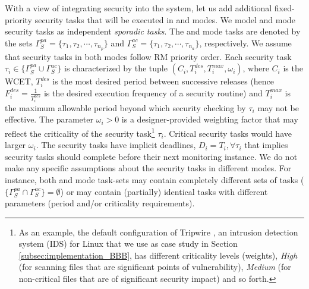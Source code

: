\documentclass[../rt_server_main.tex]{subfiles}
\begin{document}
With a view of integrating  security into the system, let us add additional fixed-priority security tasks that will be executed in \pve and \ave modes. We model \pve and \ave mode security tasks as independent \textit{sporadic tasks}. The \pve and \ave mode tasks are denoted by the sets $\Gamma_S^{pa} = \lbrace \tau_1, \tau_2, \cdots , \tau_{n_p} \rbrace$ and $\Gamma_S^{ac} = \lbrace \tau_1, \tau_2, \cdots , \tau_{n_a} \rbrace$, respectively.
We assume that security tasks in both modes follow RM priority order. Each security task $\tau_i \in \lbrace \Gamma_S^{pa} \cup \Gamma_S^{ac} \rbrace$ is characterized by the tuple $(C_i, T_i^{des}, T_i^{max}, \omega_i)$, where $C_i$ is the WCET, $T_i^{des}$ is the most desired period between successive releases (hence $F_i^{des} = \frac{1}{T_i^{des}}$ is the desired execution frequency of a security routine) and $T_i^{max}$ is the maximum allowable period beyond which security checking by $\tau_i$ may not be effective. The parameter $\omega_i > 0$ is a designer-provided weighting factor that may reflect the criticality of the security task\footnote{As an example, the default configuration of Tripwire \cite{tripwire}, an intrusion detection system (IDS) for Linux that we use as case study in Section \ref{subsec:implementation_BBB}, has different criticality levels (\viz weights), \ie  \textit{High} (for scanning files that are significant points of vulnerability), \textit{Medium} (for non-critical files that are of significant security impact) and so forth.} $\tau_i$. %
Critical security tasks would have larger $\omega_i$. The security tasks have implicit deadlines, \eg $D_i = T_i, \forall \tau_i$ that implies security tasks should complete before %
their next monitoring instance. 
We do not make any specific assumptions about the security tasks in different modes. For instance, both \pve and \ave mode task-sets may contain completely different sets of tasks (\eg $\lbrace \Gamma_S^{pa} \cap \Gamma_S^{ac} \rbrace = \emptyset$) or may contain (partially) identical tasks with different parameters (\eg period and/or criticality requirements). 
 
\end{document}
